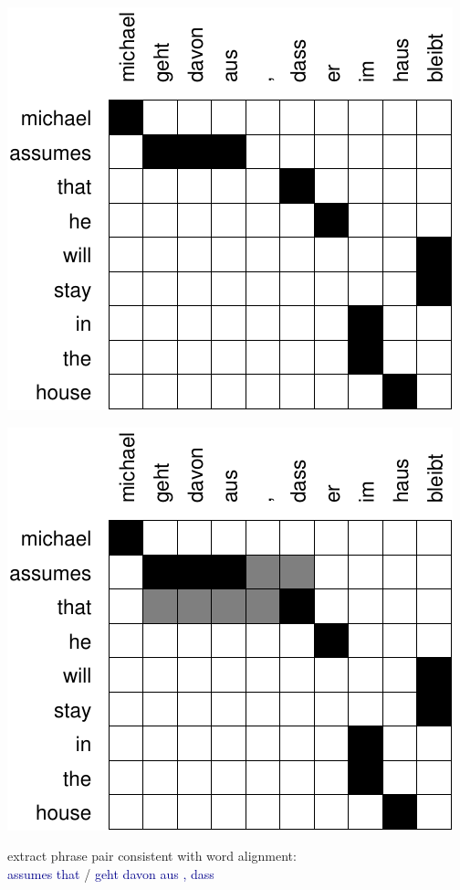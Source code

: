 \documentclass[landscape]{slides}
\newcommand{\example}[1]{\textcolor{darkblue}{\rm #1}}
\begin{document}
\begin{center}
\includegraphics[scale=1.2]{michael-alignment.pdf}
\end{center}


\begin{center}
\includegraphics[scale=1.2]{michael-phrase-extract.pdf}

\vspace{10mm}extract phrase pair consistent with word alignment:\\[5mm] \example{assumes that} / \example{geht davon aus , dass}


\end{center}
\end{document}
